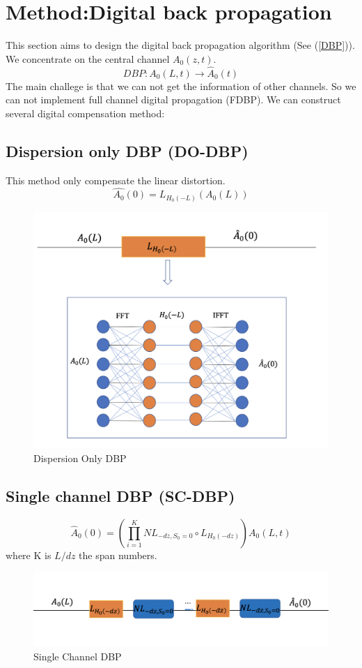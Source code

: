 \section{Method:Digital back propagation}
This section aims to design the digital back propagation algorithm (See (\ref{DBP})). We concentrate on the central channel $A_0(z,t)$.
$$
DBP: A_0(L,t) \rightarrow \hat{A}_0(t)  
$$
The main challege is that we can not get the information of other channels. So we can not implement full channel digital propagation (FDBP).
We can construct several digital compensation method:

\subsection{Dispersion only DBP (DO-DBP)}
This method only compensate the linear distortion.
$$
\hat{A_0}(0) = L_{H_0(-L)}(A_0(L))
$$
\begin{figure}[htbp]
\centering
\includegraphics[width=0.6\linewidth]{img/DO-DBP.png}
\caption{Dispersion Only DBP}
\label{DO-DBP}
\end{figure}
\subsection{Single channel DBP (SC-DBP)}
$$
\hat{A}_0(0) = \left(\prod_{i=1}^{K} NL_{-dz,S_0=0} \circ L_{H_0(-dz)}\right)A_0(L,t)
$$
where K is $L/dz$ the span numbers. 
\begin{figure}[htbp]
  \centering
  \includegraphics[width=0.6\linewidth]{img/SC-DBP.png}
  \caption{Single Channel DBP}
  \label{SC-DBP}
\end{figure}

